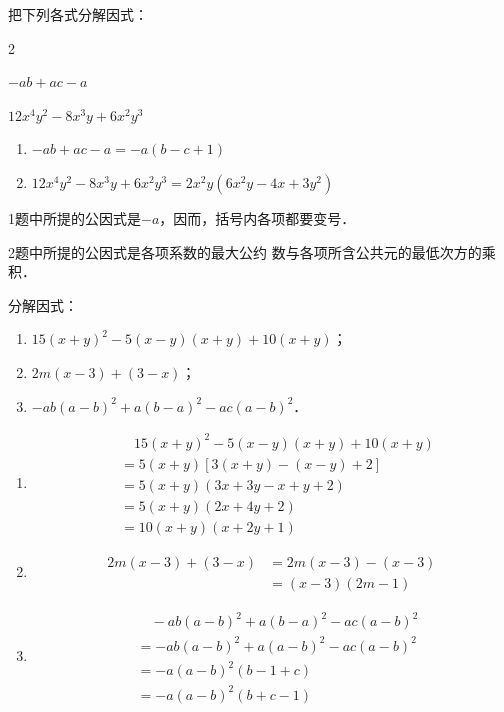 \begin{example}
    把下列各式分解因式：
\begin{enumerate}
    \begin{multicols}{2}
           \item $-ab+ac-a$
    \item $12x^4y^2-8x^3y+6x^2y^3$
    \end{multicols}
\end{enumerate}
\end{example}

\begin{solution}
\begin{enumerate}
    \item $-ab+ac-a=-a(b-c+1)$
    \item $12x^4y^2-8x^3y+6x^2y^3=2x^2y(6x^2y-4x+3y^2)$
\end{enumerate}
\end{solution}

\begin{note}
1题中所提的公因式是$-a$，因而，括号内各项都要变号．

2题中所提的公因式是各项系数的最大公约
    数与各项所含公共元的最低次方的乘积．
\end{note}

\begin{example}
分解因式：
\begin{enumerate}
    \item $15(x+y)^2-5(x-y)(x+y)+10(x+y)$；
    \item $2m(x-3)+(3-x)$；
    \item $-ab(a-b)^2+a(b-a)^2-ac(a-b)^2$．
\end{enumerate} 
\end{example}

\begin{solution}
\begin{enumerate}
    \item \[\begin{split}
     &\quad   15 (x+y)^2-5 (x-y) (x+y)+10 (x+y)\\
    &=5 (x+y) [3(x+y)-(x-y)+2]\\
    &=5 (x+y) (3x+3y-x+y+2)\\
    &=5 (x+y) (2x+4y+2)\\
    &=10 (x+y) (x+2y+1)
    \end{split}\]
    \item \[\begin{split}
        2m (x-3) + (3-x)&= 2m (x-3) - (x-3)\\
        &= (x-3) (2m-1)
    \end{split}\]
        \item \[\begin{split}
       &\quad      -ab(a-b)^2 +a(b-a)^2 - ac(a-b)^2\\
            &= -ab (a-b)^2 +a (a-b)^2-ac (a-b)^2\\
            &=  -a (a-b)^2 (b-1+c)\\
            &=-a(a-b)^2 (b+c-1)
        \end{split}\]
\end{enumerate}
\end{solution}

